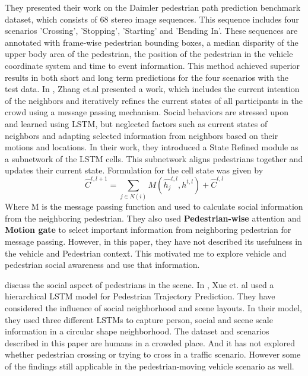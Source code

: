 They presented their work on the Daimler pedestrian path prediction benchmark dataset, which consists of 68 stereo image sequences. This sequence includes four scenarios 'Crossing', 'Stopping', 'Starting' and 'Bending In'. These sequences are annotated with frame-wise pedestrian bounding boxes, a median disparity of the upper body area of the pedestrian, the position of the pedestrian in the vehicle coordinate system and time to event information. This method achieved superior results in both short and long term predictions for the four scenarios with the test data.
In \cite{zhang2019sr}, Zhang et.al presented a work, which includes the current intention of the neighbors and iteratively refines the current states of all participants in the crowd using a message passing mechanism. Social behaviors are stressed upon and learned using LSTM, but \cite{zhang2019sr} neglected factors such as current states of neighbors and adapting selected information from neighbors based on their motions and locations. In their work, they introduced a State Refined module as a subnetwork of the LSTM cells. This subnetwork aligns pedestrians together and updates their current state. Formulation for the cell state was given by 
\begin{equation}
\hat{C}^{t, l+1}= \sum_{j\in N(i)}M(\hat{h_j}^{t, l}, {h}^{t, l}) + \hat{C}^{t, l}
\end{equation}
Where M is the message passing function and used to calculate social information from the neighboring pedestrian. They also used \textbf{Pedestrian-wise }attention and \textbf{Motion gate} to select important information from neighboring pedestrian for message passing. However, in this paper, they have not described its usefulness in the vehicle and Pedestrian context. This motivated me to explore vehicle and pedestrian social awareness and use that information.


\cite{alahi2016social, xue2018ss} discuss the social aspect of pedestrians in the scene. In \cite{xue2018ss}, Xue et. al used a hierarchical LSTM model for Pedestrian Trajectory Prediction. They have considered the influence of social neighborhood and scene layouts. In their model, they used three different LSTMs to capture person, social and scene scale information in a circular shape neighborhood. The dataset and scenarios described in this paper are humans in a crowded place. And it has not explored whether pedestrian crossing or trying to cross in a traffic scenario. However some of the findings still applicable in the pedestrian-moving vehicle scenario as well.


